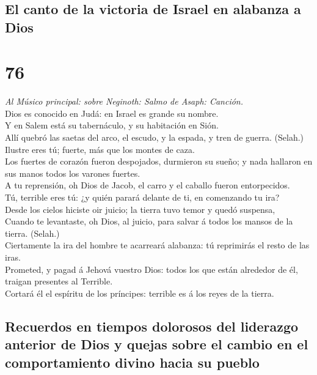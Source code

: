 \hypertarget{el-canto-de-la-victoria-de-israel-en-alabanza-a-dios}{%
\subsection{El canto de la victoria de Israel en alabanza a
Dios}\label{el-canto-de-la-victoria-de-israel-en-alabanza-a-dios}}

\hypertarget{section-75}{%
\section{76}\label{section-75}}

 \emph{Al Músico principal: sobre Neginoth: Salmo de Asaph:
Canción.}\\
Dios es conocido en Judá: en Israel es grande su nombre.\\
 Y en Salem está su tabernáculo, y su habitación en Sión.\\
 Allí quebró las saetas del arco, el escudo, y la espada, y
tren de guerra. (Selah.)\\
 Ilustre eres tú; fuerte, más que los montes de caza.\\
 Los fuertes de corazón fueron despojados, durmieron su
sueño; y nada hallaron en sus manos todos los varones fuertes.\\
 A tu reprensión, oh Dios de Jacob, el carro y el caballo
fueron entorpecidos.\\
 Tú, terrible eres tú: ¿y quién parará delante de ti, en
comenzando tu ira?\\
 Desde los cielos hiciste oir juicio; la tierra tuvo temor y
quedó suspensa,\\
 Cuando te levantaste, oh Dios, al juicio, para salvar á
todos los mansos de la tierra. (Selah.)\\
 Ciertamente la ira del hombre te acarreará alabanza: tú
reprimirás el resto de las iras.\\
 Prometed, y pagad á Jehová vuestro Dios: todos los que
están alrededor de él, traigan presentes al Terrible.\\
 Cortará él el espíritu de los príncipes: terrible es á los
reyes de la tierra.

\hypertarget{recuerdos-en-tiempos-dolorosos-del-liderazgo-anterior-de-dios-y-quejas-sobre-el-cambio-en-el-comportamiento-divino-hacia-su-pueblo}{%
\subsection{Recuerdos en tiempos dolorosos del liderazgo anterior de
Dios y quejas sobre el cambio en el comportamiento divino hacia su
pueblo}\label{recuerdos-en-tiempos-dolorosos-del-liderazgo-anterior-de-dios-y-quejas-sobre-el-cambio-en-el-comportamiento-divino-hacia-su-pueblo}}

